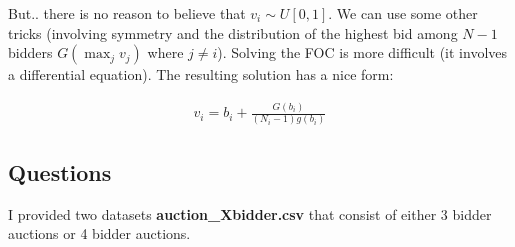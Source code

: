 \documentclass{article}
\begin{document}
But.. there is no reason to believe that $v_i \sim U[0,1]$. We can use some other tricks (involving symmetry and the distribution of the highest bid among $N-1$ bidders $G(\max_j v_j)$ where $j \neq i$). Solving the FOC is more difficult (it involves a differential equation). The resulting solution has a nice form:

\begin{eqnarray}
\label{eq:general}
v_i = b_i + \frac{G(b_i)}{(N_i -1) g(b_i)}
\end{eqnarray}

\newpage

\subsection*{Questions}

I provided two datasets \textbf{auction\_Xbidder.csv} that consist of either 3 bidder auctions or 4 bidder auctions.
\end{document}
